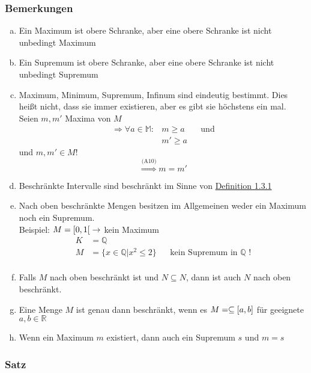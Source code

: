 \documentclass{article}
\begin{document}
\subsubsection{Bemerkungen}
\begin{enumerate}[(a)]
\item Ein Maximum ist obere Schranke, aber eine obere Schranke ist nicht unbedingt Maximum
\item Ein Supremum ist obere Schranke, aber eine obere Schranke ist nicht unbedingt Supremum
\item Maximum, Minimum, Supremum, Infinum sind eindeutig bestimmt. Dies heißt nicht, dass sie immer existieren, aber es gibt sie höchstens ein mal.
  \\
  Seien $m, m'$ Maxima von $M$
  \begin{align*}
    \Rightarrow \forall a \in \mathbb{M} \colon &m \geq a && \text{und} \\
                                                &m' \geq a
  \end{align*}
  und $m, m' \in M$!
  \[
    \overset{\text{(A10)}}\Rightarrow m = m'
  \]
\item Beschränkte Intervalle sind beschränkt im Sinne von \hyperref[sec:1.3.1]{Definition 1.3.1}
\item Nach oben beschränkte Mengen besitzen im Allgemeinen weder ein Maximum noch ein Supremum. \\
  Beispiel: $M = \interval[open right]{0}{1} \to $ kein Maximum
  \begin{align*}
    K &= \mathbb{Q} \\
    M &= \{ x \in \mathbb{Q} | x^2 \leq 2\} && \text{kein Supremum in $\mathbb{Q}$ !} \\
  \end{align*}
\item Falls $M$ nach oben beschränkt ist und $N \subseteq N$, dann ist auch $N$ nach oben beschränkt.
\item Eine Menge $M$ ist genau dann beschränkt, wenn es $M = \subseteq \interval{a}{b}$ für geeignete $a, b \in \mathbb{R}$
\item Wenn ein Maximum $m$ existiert, dann auch ein Supremum $s$ und $m = s$
\end{enumerate}

\subsubsection{Satz}
\end{document}
